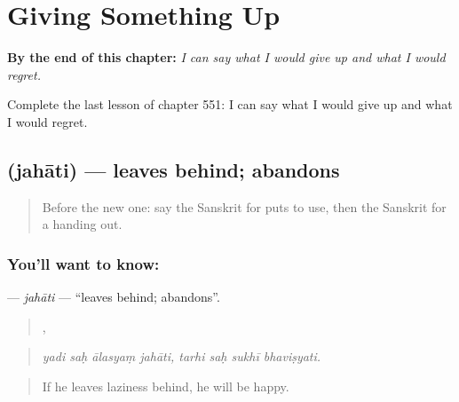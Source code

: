 
\chapter{Giving Something Up}
\label{ch:sa-giving-something-up}

\begin{chapteropening}
\textbf{By the end of this chapter:} \emph{I can say what I would give up and what I would regret.}

Complete the last lesson of chapter 551: I can say what I would give up and what I would regret.
\end{chapteropening}

\section[\texorpdfstring{\sk{जहाति} (jahāti)}{जहाति (jahāti)}]{ (jahāti) — leaves behind; abandons}

\label{lesson:SA-C551-jahati}



\begin{quote}
Before the new one: say the Sanskrit for puts to use, then the Sanskrit for a handing out.
\end{quote}

\subsection*{You'll want to know: }
\textbf{} — \emph{jahāti} — \textquotedblleft{}leaves behind; abandons\textquotedblright{}.

\begin{quote}
   ,    
\end{quote}

\begin{quote}
\emph{yadi saḥ ālasyaṃ jahāti, tarhi saḥ sukhī bhaviṣyati.}
\end{quote}

\begin{quote}
If he leaves laziness behind, he will be happy.
\end{quote}

